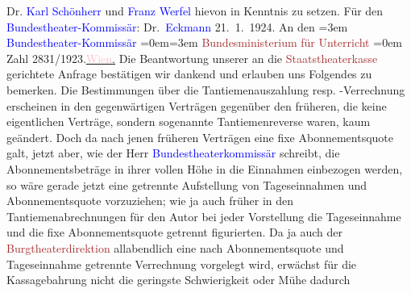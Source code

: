                Dr. \textcolor{blue}{Karl Schönherr}{}\ledrightnote{\textcolor{blue}{Karl Schönherr}} und \textcolor{blue}{Franz Werfel}{}\ledrightnote{\textcolor{blue}{Franz Werfel}} hievon in Kenntnis zu setzen.\pend
           \pstart
           Für den \textcolor{blue}{Bundestheater-Kommissär}{}: \spacefill\mbox{Dr. \textcolor{blue}{Eckmann}{}\ledrightnote{\textcolor{blue}{Alfred Eckmann}}}\pend
           {\bigskip}\pstart
           \raggedleft{}{\pb}21. 1. 1924.\pend
           \pstart
           An den\pend
           \leftskip=3em{}\pstart
           \noindent{}\textcolor{blue}{Bundestheater-Kommissär}{}\pend
           \leftskip=0em{}\leftskip=3em{}\pstart
           \textcolor{brown}{Bundesministerium für Unterricht}{}\ledrightnote{\textcolor{brown}{Ministerium für Unterricht}}\pend
           \leftskip=0em{}\pstart
           \noindent{}Zahl 2831/1923.\hfill \uline{\textcolor{pink}{Wien}{}\ledrightnote{\textcolor{pink}{Wien}}.}\pend
           \pstart
           Die Beantwortung unserer an die \textcolor{brown}{Staatstheaterkasse}{}\ledrightnote{\textcolor{brown}{Bundestheaterkassen}}
               gerichtete Anfrage bestätigen wir dankend und erlauben uns Folgendes zu bemerken.\pend
           \pstart
           Die Bestimmungen über die Tantiemenauszahlung resp. -Verrechnung erscheinen in den
               gegenwärtigen Verträgen gegenüber den früheren, die keine eigentlichen Verträge,
               sondern sogenannte Tantiemenreverse waren, kaum geändert. Doch da nach jenen früheren
               Verträgen eine fixe Abonnementsquote galt, jetzt aber, wie der Herr \textcolor{blue}{Bundestheaterkommissär}{} schreibt, die
               Abonnementsbeträge in ihrer vollen Höhe in die Einnahmen einbezogen werden, so wäre
               gerade jetzt eine getrennte Aufstellung von Tageseinnahmen und Abonnementsquote
               vorzuziehen; wie ja auch früher in den Tantiemenabrechnungen für den Autor bei jeder
               Vorstellung die Tageseinnahme und die fixe Abonnementsquote getrennt figurierten.\pend
           \pstart
           Da ja auch der \textcolor{brown}{Burgtheaterdirektion}{}\ledrightnote{\textcolor{brown}{Burgtheater}} allabendlich
               eine nach Abonnementsquote und Tageseinnahme getrennte Verrechnung vorgelegt wird,
               erwächst für die Kassagebahrung nicht die geringste Schwierigkeit oder Mühe dadurch
